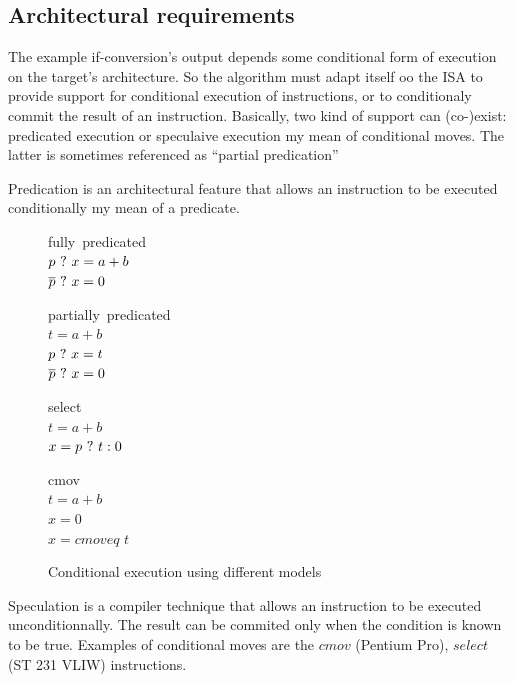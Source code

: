 \subsection{Architectural requirements}
The example if-conversion's output depends some conditional form of execution on the target's architecture. So the algorithm must adapt itself oo the ISA to provide support for conditional execution of instructions, or to conditionaly commit the result of an instruction.
Basically, two kind of support can (co-)exist: predicated execution or speculaive execution my mean of conditional moves. The latter is sometimes referenced as ``partial predication''

Predication is an architectural feature that allows an instruction to be executed conditionally my mean of a predicate.

\begin{figure}
\begin{minipage}[t]{3cm}
\mbox{fully predicated} \\
$ p ~?~ x = a + b $ \\
$ \overline{p} ~?~ x = 0 $ \\
\label{fig:pred}
\end{minipage}
\begin{minipage}[t]{3cm}
\mbox{partially predicated} \\
$t = a + b $ \\
$p ~?~ x = t $ \\
$\overline{p} ~?~ x = 0 $ \\
\end{minipage}
\begin{minipage}[t]{3cm}
\mbox{select} \\
$t = a + b $ \\
$x= p ~?~ t : 0 $ \\
\end{minipage}
\begin{minipage}[t]{3cm}
\mbox{cmov} \\
$t = a + b $ \\
$x = 0 $ \\
$x = cmoveq$ $t$ \\
\end{minipage}
\caption{Conditional execution using different models}
\label{fig:pred}
\end{figure}

Speculation is a compiler technique that allows an instruction to be executed unconditionnally. The result can be commited only when the condition is known to be true. Examples of conditional moves are the $cmov$ (Pentium Pro), $select$ (ST 231 VLIW) instructions.

